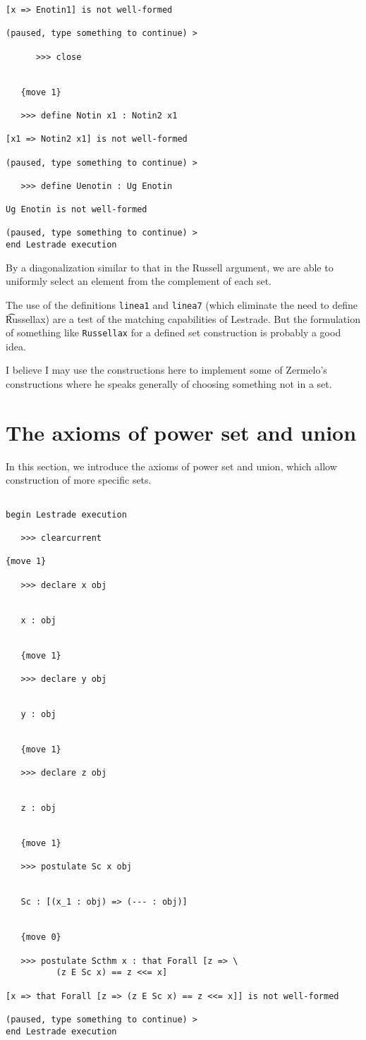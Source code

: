 \documentclass[12pt]{article}
\begin{document}
\begin{verbatim}
[x => Enotin1] is not well-formed

(paused, type something to continue) >

      >>> close


   {move 1}

   >>> define Notin x1 : Notin2 x1

[x1 => Notin2 x1] is not well-formed

(paused, type something to continue) >

   >>> define Uenotin : Ug Enotin

Ug Enotin is not well-formed

(paused, type something to continue) >
end Lestrade execution
\end{verbatim}

By a diagonalization similar to that in the Russell argument, we are able to uniformly select an element from the complement of each set.

The use of the definitions {\tt linea1} and {\tt linea7} (which eliminate the need to define {\t Russellax}) are a test of the matching capabilities of Lestrade.  But the formulation of something like {\tt Russellax} for a defined set construction is probably a good idea.

I believe I may use the constructions here to implement some of Zermelo's constructions where he speaks generally of choosing something not in a set.

\section{The axioms of power set and union}

In this section, we introduce the axioms of power set and union, which allow construction of more specific sets.

\begin{verbatim}

begin Lestrade execution

   >>> clearcurrent

{move 1}

   >>> declare x obj


   x : obj


   {move 1}

   >>> declare y obj


   y : obj


   {move 1}

   >>> declare z obj


   z : obj


   {move 1}

   >>> postulate Sc x obj


   Sc : [(x_1 : obj) => (--- : obj)]


   {move 0}

   >>> postulate Scthm x : that Forall [z => \
          (z E Sc x) == z <<= x]

[x => that Forall [z => (z E Sc x) == z <<= x]] is not well-formed

(paused, type something to continue) >
end Lestrade execution
\end{verbatim}
\end{document}
